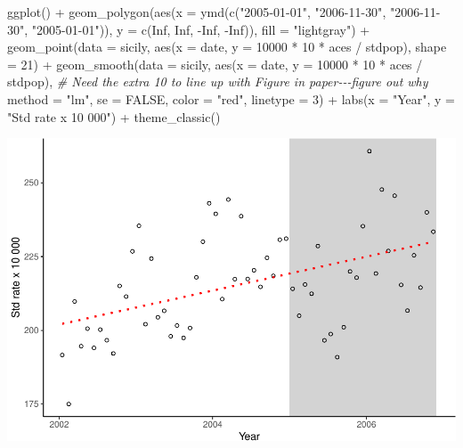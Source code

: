 \documentclass[
]{book}
\newenvironment{Shaded}{\begin{snugshade}}{\end{snugshade}}
\newcommand{\AttributeTok}[1]{\textcolor[rgb]{0.77,0.63,0.00}{#1}}
\newcommand{\CommentTok}[1]{\textcolor[rgb]{0.56,0.35,0.01}{\textit{#1}}}
\newcommand{\ConstantTok}[1]{\textcolor[rgb]{0.00,0.00,0.00}{#1}}
\newcommand{\DecValTok}[1]{\textcolor[rgb]{0.00,0.00,0.81}{#1}}
\newcommand{\FunctionTok}[1]{\textcolor[rgb]{0.00,0.00,0.00}{#1}}
\newcommand{\NormalTok}[1]{#1}
\newcommand{\SpecialCharTok}[1]{\textcolor[rgb]{0.00,0.00,0.00}{#1}}
\newcommand{\StringTok}[1]{\textcolor[rgb]{0.31,0.60,0.02}{#1}}
\begin{document}
\begin{Shaded}
\begin{Highlighting}[]
\FunctionTok{ggplot}\NormalTok{() }\SpecialCharTok{+} 
  \FunctionTok{geom\_polygon}\NormalTok{(}\FunctionTok{aes}\NormalTok{(}\AttributeTok{x =} \FunctionTok{ymd}\NormalTok{(}\FunctionTok{c}\NormalTok{(}\StringTok{"2005{-}01{-}01"}\NormalTok{, }\StringTok{"2006{-}11{-}30"}\NormalTok{, }
                         \StringTok{"2006{-}11{-}30"}\NormalTok{, }\StringTok{"2005{-}01{-}01"}\NormalTok{)), }
               \AttributeTok{y =} \FunctionTok{c}\NormalTok{(}\ConstantTok{Inf}\NormalTok{, }\ConstantTok{Inf}\NormalTok{, }\SpecialCharTok{{-}}\ConstantTok{Inf}\NormalTok{, }\SpecialCharTok{{-}}\ConstantTok{Inf}\NormalTok{)), }\AttributeTok{fill =} \StringTok{"lightgray"}\NormalTok{) }\SpecialCharTok{+} 
  \FunctionTok{geom\_point}\NormalTok{(}\AttributeTok{data =}\NormalTok{ sicily, }
             \FunctionTok{aes}\NormalTok{(}\AttributeTok{x =}\NormalTok{ date, }\AttributeTok{y =} \DecValTok{10000} \SpecialCharTok{*} \DecValTok{10} \SpecialCharTok{*}\NormalTok{ aces }\SpecialCharTok{/}\NormalTok{ stdpop), }\AttributeTok{shape =} \DecValTok{21}\NormalTok{) }\SpecialCharTok{+} 
  \FunctionTok{geom\_smooth}\NormalTok{(}\AttributeTok{data =}\NormalTok{ sicily, }
              \FunctionTok{aes}\NormalTok{(}\AttributeTok{x =}\NormalTok{ date, }\AttributeTok{y =} \DecValTok{10000} \SpecialCharTok{*} \DecValTok{10} \SpecialCharTok{*}\NormalTok{ aces }\SpecialCharTok{/}\NormalTok{ stdpop), }\CommentTok{\# Need the extra 10 to line up with Figure in paper{-}{-}{-}figure out why}
              \AttributeTok{method =} \StringTok{"lm"}\NormalTok{, }\AttributeTok{se =} \ConstantTok{FALSE}\NormalTok{, }\AttributeTok{color =} \StringTok{"red"}\NormalTok{, }\AttributeTok{linetype =} \DecValTok{3}\NormalTok{) }\SpecialCharTok{+} 
  \FunctionTok{labs}\NormalTok{(}\AttributeTok{x =} \StringTok{"Year"}\NormalTok{, }\AttributeTok{y =} \StringTok{"Std rate x 10 000"}\NormalTok{) }\SpecialCharTok{+} 
  \FunctionTok{theme\_classic}\NormalTok{()}
\end{Highlighting}
\end{Shaded}

\includegraphics{adv_epi_analysis_files/figure-latex/unnamed-chunk-66-1.pdf}
\end{document}
